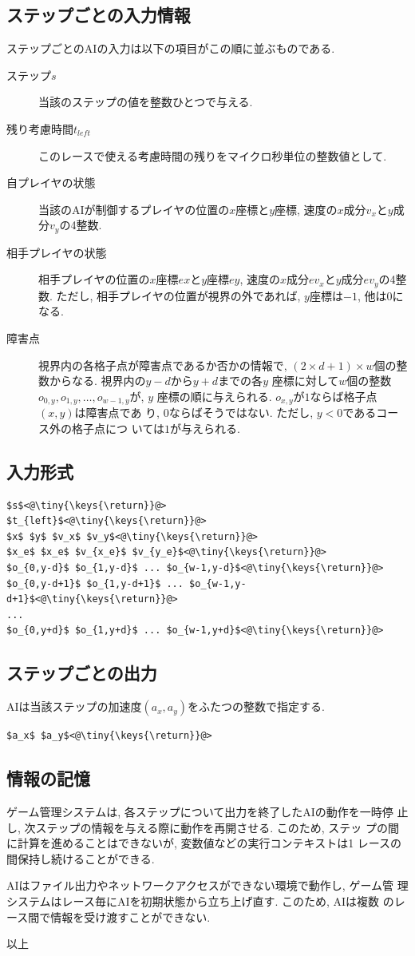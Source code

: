 \documentclass[11pt]{jarticle}
\begin{document}
\subsection{ステップごとの入力情報}
ステップごとのAIの入力は以下の項目がこの順に並ぶものである.
\begin{description}
\item[ステップ$s$] 当該のステップの値を整数ひとつで与える.
\item[残り考慮時間$t_{left}$] このレースで使える考慮時間の残りをマイクロ秒単位の整数値として.
\item[自プレイヤの状態] 当該のAIが制御するプレイヤの位置の$x$座標と$y$座標, 速度の$x$成分$v_x$と$y$成分$v_y$の4整数.
\item[相手プレイヤの状態] 相手プレイヤの位置の$x$座標$ex$と$y$座標$ey$, 速度の$x$成分$ev_x$と$y$成分$ev_y$の4整数.
  ただし, 相手プレイヤの位置が視界の外であれば, $y$座標は$-1$, 他は$0$になる.
\item[障害点] 視界内の各格子点が障害点であるか否かの情報で,
  $(2\times d+1)\times w$個の整数からなる. 視界内の$y-d$から$y+d$までの各$y$
  座標に対して$w$個の整数$o_{0,y}, o_{1,y}, \ldots, o_{w-1,y}$が, $y$
  座標の順に与えられる.  $o_{x,y}$が$1$ならば格子点$(x,y)$は障害点であ
  り, $0$ならばそうではない.  ただし, $y<0$であるコース外の格子点につ
  いては$1$が与えられる.
\end{description}

\subsection{入力形式}
\begin{lstlisting}
$s$<@\tiny{\keys{\return}}@>
$t_{left}$<@\tiny{\keys{\return}}@>
$x$ $y$ $v_x$ $v_y$<@\tiny{\keys{\return}}@>
$x_e$ $x_e$ $v_{x_e}$ $v_{y_e}$<@\tiny{\keys{\return}}@>
$o_{0,y-d}$ $o_{1,y-d}$ ... $o_{w-1,y-d}$<@\tiny{\keys{\return}}@>
$o_{0,y-d+1}$ $o_{1,y-d+1}$ ... $o_{w-1,y-d+1}$<@\tiny{\keys{\return}}@>
...
$o_{0,y+d}$ $o_{1,y+d}$ ... $o_{w-1,y+d}$<@\tiny{\keys{\return}}@>
\end{lstlisting}

\subsection{ステップごとの出力}
AIは当該ステップの加速度$(a_x,a_y)$をふたつの整数で指定する.

\begin{lstlisting}
$a_x$ $a_y$<@\tiny{\keys{\return}}@>
\end{lstlisting}

\subsection{情報の記憶}
ゲーム管理システムは, 各ステップについて出力を終了したAIの動作を一時停
止し, 次ステップの情報を与える際に動作を再開させる.  このため, ステッ
プの間に計算を進めることはできないが, 変数値などの実行コンテキストは1
レースの間保持し続けることができる.

AIはファイル出力やネットワークアクセスができない環境で動作し, ゲーム管
理システムはレース毎にAIを初期状態から立ち上げ直す. このため, AIは複数
のレース間で情報を受け渡すことができない.

\begin{flushright}
以上
\end{flushright}
\end{document}
